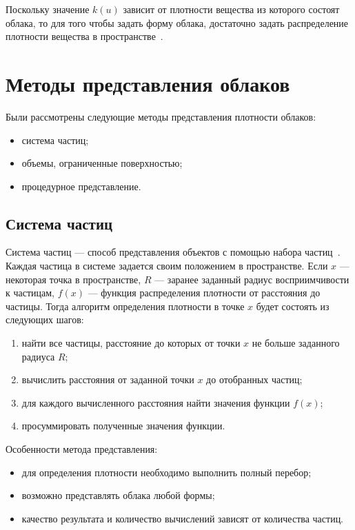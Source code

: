 Поскольку значение $k(u)$ зависит от плотности вещества из которого состоят облака, то для того чтобы задать форму облака, достаточно задать распределение плотности вещества в пространстве~\cite{partmedia, rtvg, hzd, frostbite}.  


\section{Методы представления облаков}

Были рассмотрены следующие методы представления плотности облаков:
\begin{itemize}
	\item система частиц;
	\item объемы, ограниченные поверхностью;
	\item процедурное представление.
\end{itemize}

\subsection{Система частиц}
\label{particles}
Система частиц --- способ представления объектов с помощью набора частиц~\cite{particles1}. 
Каждая частица в системе задается своим положением в пространстве. Если $x$ --- некоторая точка в пространстве, $R$ --- заранее заданный радиус восприимчивости к частицам, $f(x)$ --- функция распределения плотности от расстояния до частицы. Тогда алгоритм определения плотности в точке $x$ будет состоять из следующих шагов:
\begin{enumerate}
	\item найти все частицы, расстояние до которых от точки $x$ не больше заданного радиуса $R$;
	\item вычислить расстояния от заданной точки $x$ до отобранных частиц;
	\item для каждого вычисленного расстояния найти значения функции $f(x)$;
	\item просуммировать полученные значения функции.
\end{enumerate}

Особенности метода представления:
\begin{itemize}
	\item для определения плотности необходимо выполнить полный перебор;
	\item возможно представлять облака любой формы;
	\item качество результата и количество вычислений зависят от количества частиц.
\end{itemize}


